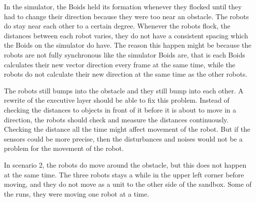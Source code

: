 In the simulator, the Boids held its formation whenever they flocked until they had to change their direction because they were too near an obstacle. The robots do stay near each other to a certain degree. Whenever the robots flock, the distances between each robot varies, they do not have a consistent spacing which the Boids on the simulator do have. The reason this happen might be because the robots are not fully synchronous like the simulator Boids are, that is each Boids calculates their new vector direction every frame at the same time, while the robots do not calculate their new direction at the same time as the other robots. 

The robots still bumps into the obstacle and they still bump into each other. A rewrite of the executive layer should be able to fix this problem. Instead of checking the distances to objects in front of it before it is about to move in a direction, the robots should check and measure the distances continuously. Checking the distance all the time might affect movement of the robot. But if the sensors could be more precise, then the disturbances and noises would not be a problem for the movement of the robot.

In scenario 2, the robots do move around the obstacle, but this does not happen at the same time. The three robots stays a while in the upper left corner before moving, and they do not move as a unit to the other side of the sandbox. Some of the runs, they were moving one robot at a time. 




